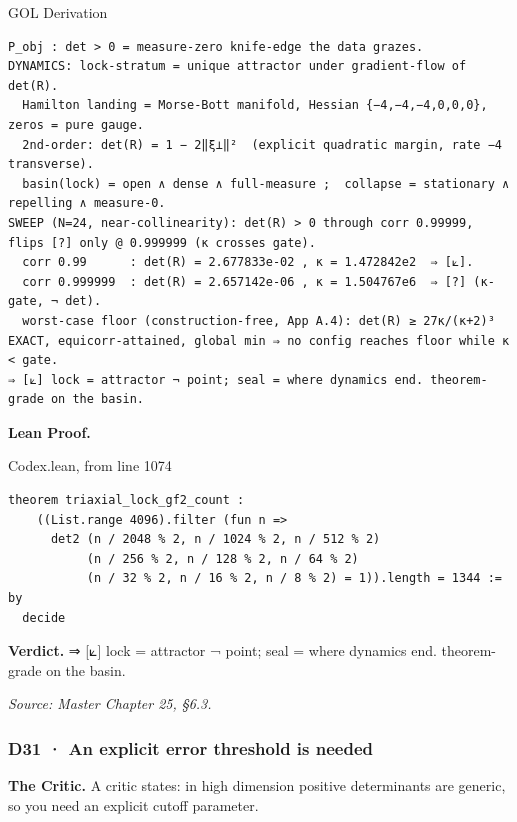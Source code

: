 \documentclass[10pt,twocolumn]{article}
\begin{document}
\begin{golbox}{GOL Derivation}
\begin{lstlisting}[style=golv]
P_obj : det > 0 = measure-zero knife-edge the data grazes.
DYNAMICS: lock-stratum = unique attractor under gradient-flow of det(R).
  Hamilton landing = Morse-Bott manifold, Hessian {−4,−4,−4,0,0,0}, zeros = pure gauge.
  2nd-order: det(R) = 1 − 2‖ξ⊥‖²  (explicit quadratic margin, rate −4 transverse).
  basin(lock) = open ∧ dense ∧ full-measure ;  collapse = stationary ∧ repelling ∧ measure-0.
SWEEP (N=24, near-collinearity): det(R) > 0 through corr 0.99999, flips [?] only @ 0.999999 (κ crosses gate).
  corr 0.99      : det(R) = 2.677833e-02 , κ = 1.472842e2  ⇒ [⟀].
  corr 0.999999  : det(R) = 2.657142e-06 , κ = 1.504767e6  ⇒ [?] (κ-gate, ¬ det).
  worst-case floor (construction-free, App A.4): det(R) ≥ 27κ/(κ+2)³ EXACT, equicorr-attained, global min ⇒ no config reaches floor while κ < gate.
⇒ [⟀] lock = attractor ¬ point; seal = where dynamics end. theorem-grade on the basin.
\end{lstlisting}
\end{golbox}

\textbf{Lean Proof.}

\begin{leanexcerpt}{Codex.lean, from line 1074}
\begin{lstlisting}[style=leanx,firstnumber=1074]
theorem triaxial_lock_gf2_count :
    ((List.range 4096).filter (fun n =>
      det2 (n / 2048 % 2, n / 1024 % 2, n / 512 % 2)
           (n / 256 % 2, n / 128 % 2, n / 64 % 2)
           (n / 32 % 2, n / 16 % 2, n / 8 % 2) = 1)).length = 1344 := by
  decide
\end{lstlisting}
\end{leanexcerpt}

\textbf{Verdict.} ⇒ {[}⟀{]} lock = attractor ¬ point; seal = where
dynamics end. theorem-grade on the basin.

\emph{Source: Master Chapter 25, §6.3.}

\hypertarget{d31-an-explicit-error-threshold-is-needed}{%
\subsubsection{D31 · An explicit error threshold is
needed}\label{d31-an-explicit-error-threshold-is-needed}}

\textbf{The Critic.} A critic states: in high dimension positive
determinants are generic, so you need an explicit cutoff parameter.
\end{document}
